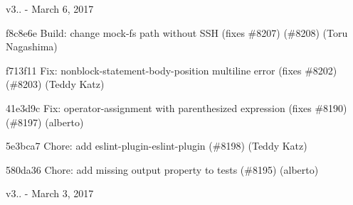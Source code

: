 v3.. -\/ March 6, 2017


\begin{DoxyItemize}
\item f8c8e6e Build\+: change mock-\/fs path without SSH (fixes \#8207) (\#8208) (Toru Nagashima)
\item f713f11 Fix\+: nonblock-\/statement-\/body-\/position multiline error (fixes \#8202) (\#8203) (Teddy Katz)
\item 41e3d9c Fix\+: {\ttfamily operator-\/assignment} with parenthesized expression (fixes \#8190) (\#8197) (alberto)
\item 5e3bca7 Chore\+: add eslint-\/plugin-\/eslint-\/plugin (\#8198) (Teddy Katz)
\item 580da36 Chore\+: add missing {\ttfamily output} property to tests (\#8195) (alberto)
\end{DoxyItemize}

v3.. -\/ March 3, 2017


